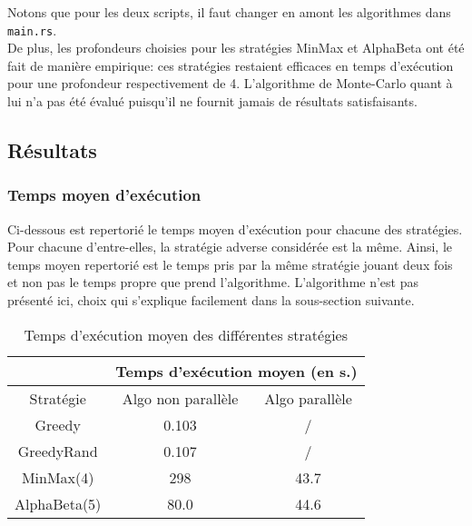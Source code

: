 \documentclass[10pt]{article}
\begin{document}
Notons que pour les deux scripts, il faut changer en amont les algorithmes dans \verb|main.rs|.
\\

De plus, les profondeurs choisies pour les stratégies MinMax et AlphaBeta ont été fait de manière empirique: ces stratégies restaient efficaces en temps d'exécution pour une profondeur respectivement de 4. L'algorithme de Monte-Carlo quant à lui n'a pas été évalué puisqu'il ne fournit jamais de résultats satisfaisants.

\subsection{Résultats}

\subsubsection{Temps moyen d'exécution}

Ci-dessous est repertorié le temps moyen d'exécution pour chacune des stratégies. Pour chacune d'entre-elles, la stratégie adverse considérée est la même. Ainsi, le temps moyen repertorié est le temps pris par la même stratégie jouant deux fois et non pas le temps propre que prend l'algorithme.
L'algorithme n'est pas présenté ici, choix qui s'explique facilement dans la sous-section suivante.

\begin{table}[H]
    \begin{center}
        \begin{tabular}{@{}|c|cc|@{}}
            \toprule
            \multicolumn{1}{|l|}{} & \multicolumn{2}{c|}{Temps d'exécution moyen (en s.)}                  \\ \midrule
            Stratégie              & \multicolumn{1}{c|}{Algo non parallèle}              & Algo parallèle \\ \midrule
            Greedy                 & \multicolumn{1}{c|}{0.103}                           & /              \\
            GreedyRand             & \multicolumn{1}{c|}{0.107}                           & /              \\
            MinMax(4)              & \multicolumn{1}{c|}{298}                                & 43.7           \\
            AlphaBeta(5)           & \multicolumn{1}{c|}{80.0}                            & 44.6          \\ \midrule
        \end{tabular}
        \caption{Temps d'exécution moyen des différentes stratégies}
    \end{center}
\end{table}
\end{document}
